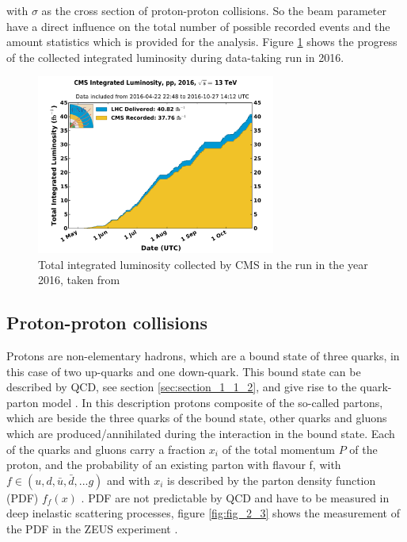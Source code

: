 with $\sigma$ as the cross section of proton-proton collisions. So the beam parameter have a direct influence on the total number of possible recorded events and the amount statistics which is provided for the analysis. Figure \ref{fig:fig_2_2} shows the progress of the collected integrated luminosity during  data-taking run in 2016. 

\begin{figure}[ht]
	\centering
	\includegraphics[width=0.7\textwidth]{pictures/int_lumi_per_day_cumulative_pp_2016.pdf}

	\caption[Total integrated luminosity of the year 2016]{Total integrated luminosity collected by \gls{CMS} in the run in the year 2016, taken from \cite{CMSLUMI}}
	\label{fig:fig_2_2}
\end{figure}


\subsection{Proton-proton collisions}
\label{sec:section_2_1_2}

Protons are non-elementary hadrons, which are a bound state of three quarks, in this case of two up-quarks and one down-quark. This bound state can be described by \gls{QCD}, see section \ref{sec:section_1_1_2}, and give rise to the quark-parton model \cite{Peskin}. In this description protons composite of the so-called partons, which are beside the three quarks of the bound state, other quarks and gluons which are produced/annihilated during the interaction in the bound state. Each of the quarks and gluons carry a fraction $x_{i}$ of the total momentum $P$ of the proton, and the probability of an existing parton with flavour f, with $f \in (u, d, \bar{u}, \bar{d}, ... g)$ and with $x_{i}$ is described by the parton density function (\gls{PDF}) $f_{f}(x)$ \cite{Peskin, PDF1}. \gls{PDF} are not predictable by \gls{QCD} and have to be measured in deep inelastic scattering processes, figure \ref{fig:fig_2_3} shows the measurement of the \gls{PDF} in the ZEUS experiment \cite{ZEUS}. \\


